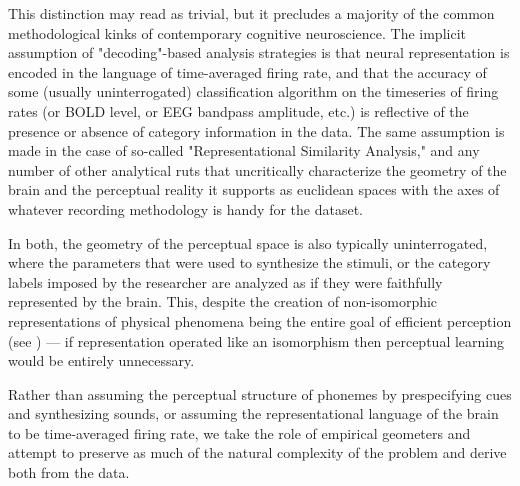 This distinction may read as trivial, but it precludes a majority of the common methodological kinks of contemporary cognitive neuroscience. The implicit assumption of "decoding"-based analysis strategies is that neural representation is encoded in the language of time-averaged firing rate, and that the accuracy of some (usually uninterrogated) classification algorithm on the timeseries of firing rates (or BOLD level, or EEG bandpass amplitude, etc.) is reflective of the presence or absence of category information in the data. The same assumption is made in the case of so-called "Representational Similarity Analysis," and any number of other analytical ruts that uncritically characterize the geometry of the brain and the perceptual reality it supports as euclidean spaces with the axes of whatever recording methodology is handy for the dataset. 

In both, the geometry of the perceptual space is also typically uninterrogated, where the parameters that were used to synthesize the stimuli, or the category labels imposed by the researcher are analyzed as if they were faithfully represented by the brain. This, despite the creation of non-isomorphic representations of physical phenomena being the entire goal of efficient perception (see \citep{stilpEfficientCodingStatistically2012,wangNeuralCodingStrategies2007}) --- if representation operated like an isomorphism then perceptual learning would be entirely unnecessary.

Rather than assuming the perceptual structure of phonemes by prespecifying cues and synthesizing sounds, or assuming the representational language of the brain to be time-averaged firing rate, we take the role of empirical geometers and attempt to preserve as much of the natural complexity of the problem and derive both from the data. 


